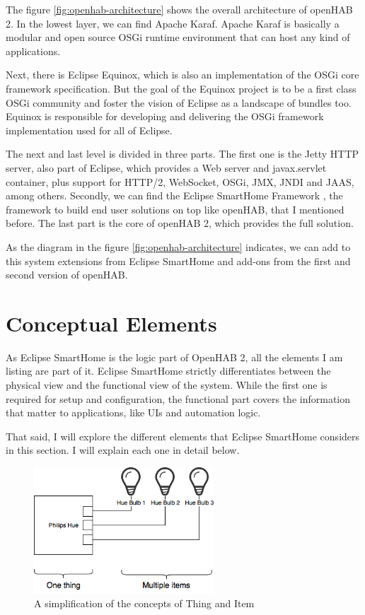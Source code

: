 The figure \ref{fig:openhab-architecture} shows the overall architecture of openHAB 2. In the lowest layer, we can find Apache Karaf.
Apache Karaf is basically a modular and open source OSGi runtime environment that can host any kind of applications.\cite{apacheKaraf}
 
Next, there is Eclipse Equinox, which is also an implementation of the OSGi core framework specification. But the goal of the Equinox
project is to be a first class OSGi community and foster the vision of Eclipse as a landscape of bundles too. Equinox is responsible for
developing and delivering the OSGi framework implementation used for all of Eclipse.\cite{eclipseEquinox} 

The next and last level is divided in three parts. The first one is the Jetty HTTP server, also part of Eclipse, which provides a Web server 
and javax.servlet container, plus support for HTTP/2, WebSocket, OSGi, JMX, JNDI and JAAS, among others.\cite{eclipseJetty} Secondly,
we can find the Eclipse SmartHome Framework , the framework to build end user solutions on top like openHAB, that I mentioned 
before.\cite{eclipseSmartHomeDocs} The last part is the core of openHAB 2, which provides the full solution.

As the diagram in the figure \ref{fig:openhab-architecture} indicates, we can add to this system extensions from Eclipse SmartHome and
add-ons from the first and second version of openHAB.

\section{Conceptual Elements}
As Eclipse SmartHome is the logic part of OpenHAB 2, all the elements I am listing are part of it. Eclipse SmartHome strictly differentiates
between the physical view and the functional view of the system. While the first one is required for setup and configuration, the functional
part covers the information that matter to applications, like UIs and automation logic.

That said, I will explore the different elements that Eclipse SmartHome considers in this section. I will explain each one in detail below.

\begin{figure}
	\centering
	\includegraphics[width=0.6\textwidth]{images/Chapter_05/openhab-concepts-basics.png}
	\caption{A simplification of the concepts of Thing and Item}
	\label{fig:openhab-concepts-basics}
\end{figure}

